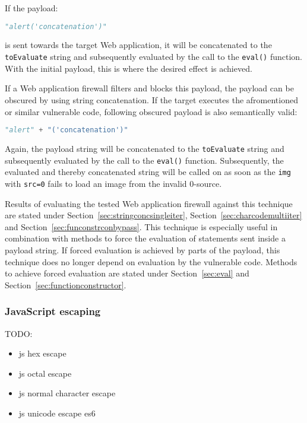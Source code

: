 If the payload:

\begin{lstlisting}[style=basicStyle, language=Python]
"alert('concatenation')"
\end{lstlisting}

is sent towards the target Web application, it will be concatenated to the \verb|toEvaluate| string and subsequently evaluated by the call to the \verb|eval()| function. With the initial payload, this is where the desired effect is achieved. 

If a Web application firewall filters and blocks this payload, the payload can be obscured by using string concatenation. If the target executes the afromentioned or similar vulnerable code, following obscured payload is also semantically valid:

\begin{lstlisting}[style=basicStyle, language=Python]
"alert" + "('concatenation')"
\end{lstlisting}

Again, the payload string will be concatenated to the \verb|toEvaluate| string and subsequently evaluated by the call to the \verb|eval()| function. Subsequently, the evaluated and thereby concatenated string will be called on as soon as the \verb|img| with \verb|src=0| fails to load an image from the invalid 0-source.

Results of evaluating the tested Web application firewall against this technique are stated under Section~\ref{sec:stringconcsingleiter}, Section~\ref{sec:charcodemultiiter} and Section~\ref{sec:funconstrconbypass}. This technique is especially useful in combination with methods to force the evaluation of statements sent inside a payload string. If forced evaluation is achieved by parts of the payload, this technique does no longer depend on evaluation by the vulnerable code. Methods to achieve forced evaluation are stated under Section~\ref{sec:eval} and Section~\ref{sec:functionconstructor}.

\subsubsection{JavaScript escaping}
\label{sec:jsescape}
{\color{red} TODO:
	\begin{itemize}
		\item js hex escape
		\item js octal escape
		\item js normal character escape
		\item js unicode escape es6
	\end{itemize}
}

